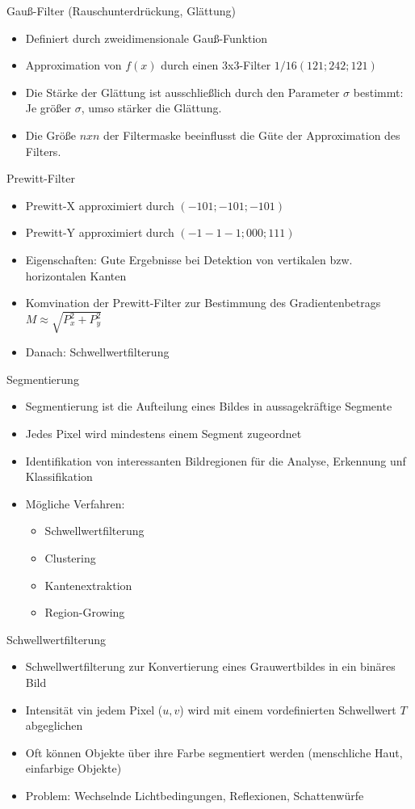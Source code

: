 \documentclass[paper=a4, fontsize=11pt]{scrartcl} %
\numberwithin{equation}{section} %
\numberwithin{figure}{section} %
\numberwithin{table}{section} %
\begin{document}
Gauß-Filter (Rauschunterdrückung, Glättung)
\begin{itemize}
\item Definiert durch zweidimensionale Gauß-Funktion
\item Approximation von $f(x)$ durch einen 3x3-Filter $1/16 (1 2 1; 2 4 2; 1 2 1)$
\item Die Stärke der Glättung ist ausschließlich durch den Parameter $\sigma$ bestimmt: Je größer $\sigma$, umso stärker die Glättung.
\item Die Größe $nxn$ der Filtermaske beeinflusst die Güte der Approximation des Filters.
\end{itemize}

Prewitt-Filter
\begin{itemize}
\item Prewitt-X approximiert durch $(-1 0 1; -1 0 1; -1 0 1)$
\item Prewitt-Y approximiert durch $(-1 -1 -1; 0 0 0; 1 1 1)$
\item Eigenschaften: Gute Ergebnisse bei Detektion von vertikalen bzw. horizontalen Kanten
\item Komvination der Prewitt-Filter zur Bestimmung des Gradientenbetrags $M \approx \sqrt{P_x^2 + P_y^2}$
\item Danach: Schwellwertfilterung
\end{itemize}

Segmentierung
\begin{itemize}
\item Segmentierung ist die Aufteilung eines Bildes in aussagekräftige Segmente
\item Jedes Pixel wird mindestens einem Segment zugeordnet
\item Identifikation von interessanten Bildregionen für die Analyse, Erkennung unf Klassifikation
\item Mögliche Verfahren:
\begin{itemize}
\item Schwellwertfilterung
\item Clustering
\item Kantenextraktion
\item Region-Growing
\end{itemize}
\end{itemize}

Schwellwertfilterung
\begin{itemize}
\item Schwellwertfilterung zur Konvertierung eines Grauwertbildes in ein binäres Bild
\item Intensität vin jedem Pixel ($u,v$) wird mit einem vordefinierten Schwellwert $T$ abgeglichen
\item Oft können Objekte über ihre Farbe segmentiert werden (menschliche Haut, einfarbige Objekte)
\item Problem: Wechselnde Lichtbedingungen, Reflexionen, Schattenwürfe
\end{itemize}
\end{document}
